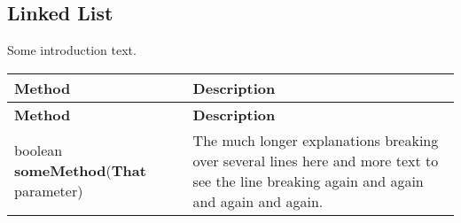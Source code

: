 \documentclass[main]{subfiles}
\begin{document}

\subsection{Linked List}
\renewcommand{\arraystretch}{1.5}


Some introduction text.

\scriptsize
\begin{longtable}{p{0.4\linewidth} p{0.6\linewidth}}
\hline \textbf{Method} & \textbf{Description}\\ \hline
\endfirsthead

\hline \textbf{Method} & \textbf{Description}\\ \hline\hline
\endhead
boolean \textbf{someMethod}(\textbf{That} parameter) & The much longer explanations breaking over several lines here and more text to see the line breaking again and again and again and again.\\
\end{longtable}
\todo[inline]{}
\end{document}
